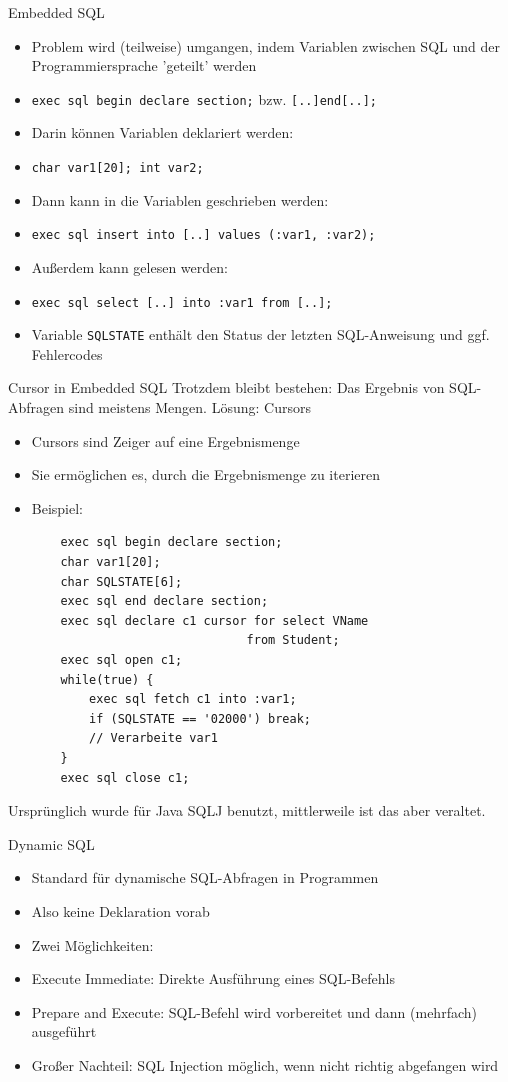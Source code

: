 \documentclass{article}
\begin{document}
\begin{block}{Embedded SQL}
  \begin{itemize}
      \item Problem wird (teilweise) umgangen, indem Variablen zwischen SQL und der Programmiersprache 'geteilt' werden
      \item \texttt{exec sql begin declare section;} bzw. \texttt{[..]end[..];}
      \item Darin können Variablen deklariert werden:
      \item \texttt{char var1[20]; int var2;}
      \item Dann kann in die Variablen geschrieben werden:
      \item \texttt{exec sql insert into [..] values (:var1, :var2);}
      \item Außerdem kann gelesen werden:
      \item \texttt{exec sql select [..] into :var1 from [..];}
      \item Variable \texttt{SQLSTATE} enthält den Status der letzten SQL-Anweisung und ggf. Fehlercodes
    \end{itemize}
\end{block}

\begin{block}{Cursor in Embedded SQL}
  Trotzdem bleibt bestehen: Das Ergebnis von SQL-Abfragen sind meistens Mengen. Lösung: Cursors
  \begin{itemize}
    \item Cursors sind Zeiger auf eine Ergebnismenge
    \item Sie ermöglichen es, durch die Ergebnismenge zu iterieren
    \item Beispiel:
    \begin{lstlisting}
    exec sql begin declare section;
    char var1[20];
    char SQLSTATE[6];
    exec sql end declare section;
    exec sql declare c1 cursor for select VName
                              from Student;
    exec sql open c1;
    while(true) {
        exec sql fetch c1 into :var1;
        if (SQLSTATE == '02000') break;
        // Verarbeite var1
    }
    exec sql close c1;
    \end{lstlisting}
  \end{itemize}
\end{block}
Ursprünglich wurde für Java SQLJ benutzt, mittlerweile ist das aber veraltet.
\begin{block}{Dynamic SQL}
  \begin{itemize}
    \item Standard für dynamische SQL-Abfragen in Programmen
    \item Also keine Deklaration vorab
    \item Zwei Möglichkeiten:
    \item Execute Immediate: Direkte Ausführung eines SQL-Befehls
    \item Prepare and Execute: SQL-Befehl wird vorbereitet und dann (mehrfach) ausgeführt
    \item Großer Nachteil: SQL Injection möglich, wenn nicht richtig abgefangen wird
  \end{itemize}
\end{block}
\end{document}
